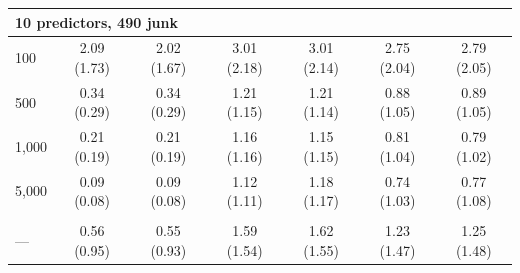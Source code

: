\documentclass[AMA,STIX1COL,doublespace]{WileyNJD-v2}
\begin{document}
\begin{table}
\begin{tabular}[t]{lcccccc}
\multicolumn{7}{l}{\textbf{10 predictors, 490 junk}}\\
\hline
\hspace{1em}100 & 2.09 (1.73) & 2.02 (1.67) & 3.01 (2.18) & 3.01 (2.14) & 2.75 (2.04) & 2.79 (2.05)\\
\hspace{1em}500 & 0.34 (0.29) & 0.34 (0.29) & 1.21 (1.15) & 1.21 (1.14) & 0.88 (1.05) & 0.89 (1.05)\\
\hspace{1em}1,000 & 0.21 (0.19) & 0.21 (0.19) & 1.16 (1.16) & 1.15 (1.15) & 0.81 (1.04) & 0.79 (1.02)\\
\hspace{1em}5,000 & 0.09 (0.08) & 0.09 (0.08) & 1.12 (1.11) & 1.18 (1.17) & 0.74 (1.03) & 0.77 (1.08)\\
\addlinespace[0.75em]
\multicolumn{7}{l}{\textbf{Overall}}\\
\hline
\hspace{1em}--- & 0.56 (0.95) & 0.55 (0.93) & 1.59 (1.54) & 1.62 (1.55) & 1.23 (1.47) & 1.25 (1.48)\\
\bottomrule
\end{tabular}
\end{table}
\end{document}
